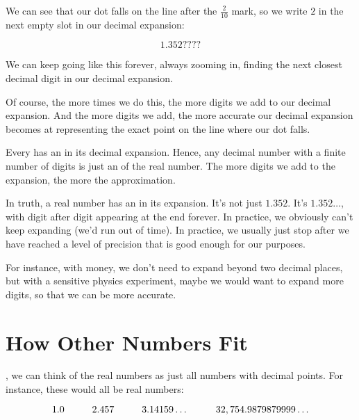 \documentclass[../../../main.tex]{subfiles}
\begin{document}
We can see that our dot falls on the line after the $\frac{2}{10}$ mark, so we write $2$ in the next empty slot in our decimal expansion:

\begin{equation*}
  1.352????
\end{equation*}

We can keep going like this forever, always zooming in, finding the next closest decimal digit in our decimal expansion.

Of course, the more times we do this, the more digits we add to our decimal expansion. And the more digits we add, the more accurate our decimal expansion becomes at representing the exact point on the line where our dot falls.

\begin{aside}
  \begin{remark}
    Every  has an  in its decimal expansion. Hence, any decimal number with a finite number of digits is just an  of the real number. The more digits we add to the expansion, the more  the approximation.
  \end{remark}
\end{aside}

In truth, a real number has an  in its expansion. It's not just $1.352$. It's $1.352\ldots$, with digit after digit appearing at the end forever. In practice, we obviously can't keep expanding (we'd run out of time). In practice, we usually just stop after we have reached a level of precision that is good enough for our purposes.

For instance, with money, we don't need to expand beyond two decimal places, but with a sensitive physics experiment, maybe we would want to expand more digits, so that we can be more accurate.


\section{How Other Numbers Fit}

, we can think of the real numbers as just all numbers with decimal points. For instance, these would all be real numbers:

\begin{equation*}
  1.0 \hskip 1cm 2.457 \hskip 1cm 3.14159\ldots \hskip 1cm 32,754.9879879999\ldots
\end{equation*}
\end{document}
